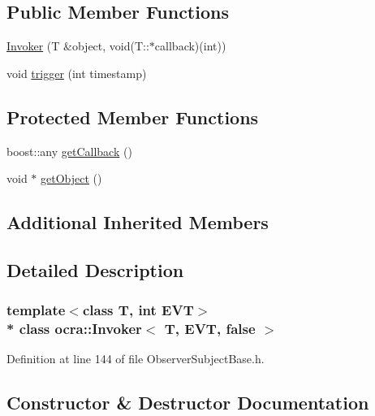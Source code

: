 \subsection*{Public Member Functions}
\begin{DoxyCompactItemize}
\item 
\hyperlink{classocra_1_1Invoker_3_01T_00_01EVT_00_01false_01_4_a913ba3411bdcdb4fa509673eb91de808}{Invoker} (T \&object, void(T\+::$\ast$callback)(int))
\item 
void \hyperlink{classocra_1_1Invoker_3_01T_00_01EVT_00_01false_01_4_a740261f9f9c3278c9668d192eae56c2a}{trigger} (int timestamp)
\end{DoxyCompactItemize}
\subsection*{Protected Member Functions}
\begin{DoxyCompactItemize}
\item 
boost\+::any \hyperlink{classocra_1_1Invoker_3_01T_00_01EVT_00_01false_01_4_a459bd95f3eae2d06b9167fd98c1c7e22}{get\+Callback} ()
\item 
void $\ast$ \hyperlink{classocra_1_1Invoker_3_01T_00_01EVT_00_01false_01_4_ad77a4342ddfd1b1e1387065276c54246}{get\+Object} ()
\end{DoxyCompactItemize}
\subsection*{Additional Inherited Members}


\subsection{Detailed Description}
\subsubsection*{template$<$class T, int E\+VT$>$\\*
class ocra\+::\+Invoker$<$ T, E\+V\+T, false $>$}



Definition at line 144 of file Observer\+Subject\+Base.\+h.



\subsection{Constructor \& Destructor Documentation}
